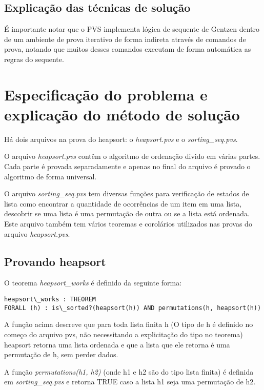 \section{Explicação das técnicas de solução}

É importante notar que o PVS implementa lógica de sequente de Gentzen dentro de um ambiente de prova iterativo de forma indireta através de comandos de prova, notando que muitos desses comandos  executam de forma automática as regras do sequente.



\chapter{Especificação do problema e explicação do método de solução}

Há dois arquivos na prova do heapsort: o \textit{heapsort.pvs} e o \textit{sorting\_seq.pvs}.

O arquivo \textit{heapsort.pvs} contêm o algoritmo de ordenação divido em várias partes. Cada parte é provada separadamente e apenas no final do arquivo é provado o algoritmo de forma universal.

O arquivo \textit{sorting\_seq.pvs} tem diversas funções para verificação de estados de lista como encontrar a quantidade de ocorrências de um item em uma lista, descobrir se uma lista é uma permutação de outra ou se a lista está ordenada. Este arquivo também tem vários teoremas e corolários utilizados nas provas do arquivo \textit{heapsort.pvs}.

\section{Provando heapsort}

O teorema \textit{heapsort\_works} é definido da seguinte forma:

\begin{verbatim}
heapsort\_works : THEOREM 
FORALL (h) : is\_sorted?(heapsort(h)) AND permutations(h, heapsort(h))
\end{verbatim}

A função acima descreve que para toda lista finita h (O tipo de h é definido no começo do arquivo pvs, não necessitando a explicitação do tipo no teorema) heapsort retorna uma lista ordenada e que a lista que ele retorna é uma permutação de h, sem perder dados.

A função \textit{permutations(h1, h2)} (onde h1 e h2 são do tipo lista finita) é definida em \textit{sorting\_seq.pvs} e retorna TRUE caso a lista h1 seja uma permutação de h2. 

